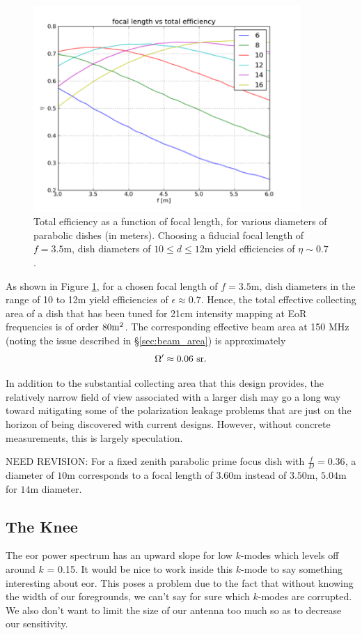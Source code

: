 \documentclass[11pt]{article}
\begin{document}
\begin{figure}
\centering
\includegraphics[width=4in]{dish_plots/focal_len_vs_eff.png}
\caption{Total efficiency as a function of focal length, for various diameters
of parabolic dishes (in meters).  Choosing a fiducial focal length of $f=3.5$m,
dish diameters of $10\le d\le 12$m yield efficiencies of $\eta\sim0.7$.}
\label{fig:focal_len_vs_eff}
\end{figure}

As shown in Figure \ref{fig:focal_len_vs_eff}, for a chosen focal length of
$f=3.5$m, dish diameters in the range of 10 to 12m yield efficiencies of
$\epsilon\approx0.7$.  Hence, the total effective collecting area of a dish that
has been tuned for 21cm intensity mapping at EoR frequencies is of order $80{\rm
m}^2$.  The corresponding effective beam area at 150 MHz 
(noting the issue described in \S\ref{sec:beam_area}) is approximately
\begin{equation}
\Omega^\prime\approx0.06\ {\rm sr}.
\end{equation}

In addition to the substantial collecting area that this design provides, the
relatively narrow field of view associated with a larger dish may go a long way
toward mitigating some of the polarization leakage problems that are just on the
horizon of being discovered with current designs.  However, without concrete
measurements, this is largely speculation.

NEED REVISION:
For a fixed zenith parabolic prime focus dish with $\frac{f}{D} = 0.36$,
a diameter of $10$m corresponds to a focal length of $3.60$m instead of
$3.50$m, $5.04$m for $14$m diameter.

\subsection{The Knee}
The eor power spectrum has an upward slope for low $k$-modes which levels off
around $k$ = 0.15. It would be nice to work inside this $k$-mode to say
something interesting about eor. This poses a problem due to the fact that
without knowing the width of our foregrounds, we can't say for sure which
$k$-modes are corrupted. We also don't want to limit the size of our antenna too
much so as to decrease our sensitivity. 
\end{document}
